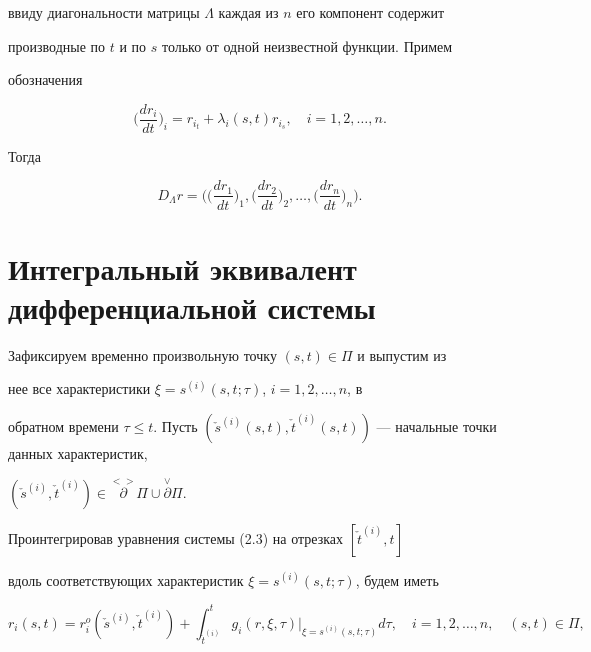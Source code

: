 ввиду диагональности матрицы $\Lambda$ каждая из $n$ его компонент содержит 


производные по $t$ и по $s$ только от одной неизвестной функции. Примем


обозначения


\begin{equation}


\bigg(\frac{dr_i}{dt}\bigg)_i=r_{i_t}+\lambda_i(s,t)r_{i_s},


\quad i=1,2,\dotsc,n.


\end{equation}


Тогда


$$


D_{\Lambda}r=\bigg(\bigg(\frac{dr_1}{dt} \bigg)_1, \bigg(


\frac{dr_2}{dt}\bigg)_2,\dotsc, \bigg(\frac{dr_n}{dt}\bigg)_n \bigg).


$$








\section{Интегральный эквивалент дифференциальной системы}





Зафиксируем временно произвольную точку $(s,t) \in {\Pi}$ и выпустим из 


нее все характеристики $\xi=s^{(i)}(s,t;\tau)$, $i=1,2,\dotsc,n$, в 


обратном времени $\tau \leq t$. Пусть $(\check{s}^{(i)} (s,t), \check{t}^{(i)}


(s,t))$ --- начальные точки данных характеристик, 


$(\check{s}^{(i)}, \check{t}^{(i)}) \in \overset{<>}{\partial}{}{\Pi} \cup 


\overset{\vee}{\partial}{}{\Pi}$. 


Проинтегрировав уравнения системы (2.3) на отрезках $[\check{t}^{(i)},t]$ 


вдоль соответствующих характеристик $\xi=s^{(i)}(s,t;\tau)$, будем иметь 


\begin{equation}


r_i (s,t)=r_i^o(\check{s}^{(i)},\check{t}^{(i)}) +


\int_{\check{t}^{(i)}}^{t} g_i(r,\xi,\tau) 


\Big|_{\xi=s^{(i)}(s,t; \tau)} d\tau,\quad


i=1,2,\dotsc,n,\quad (s,t) \in {\Pi},


\end{equation}


